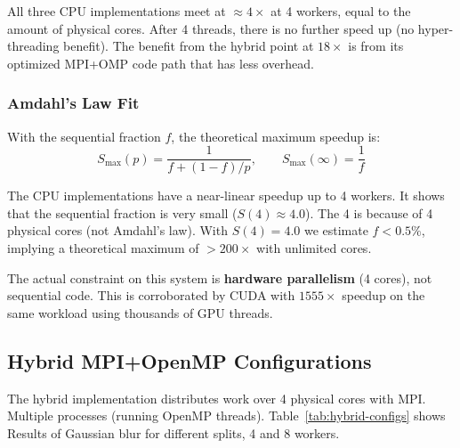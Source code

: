 ﻿\documentclass[12pt,a4paper]{article}
\begin{document}
All three CPU implementations meet at $\approx\!4\times$ at 4 workers,
equal to the amount of physical cores. After 4 threads, there is no further speed up
(no hyper-threading benefit). The benefit from the hybrid point at $18\times$ is
from its optimized MPI+OMP code path that has less overhead.

\subsubsection*{Amdahl's Law Fit}

With the sequential fraction $f$, the theoretical maximum speedup is:
\begin{equation}
  S_{\max}(p) = \frac{1}{f + (1-f)/p},\qquad
  S_{\max}(\infty) = \frac{1}{f}
\end{equation}

The CPU implementations have a near-linear speedup up to 4 workers.
It shows that the sequential fraction is very small ($S(4) \approx 4.0$).
The 4 is because of 4 physical cores (not Amdahl's
law). With $S(4) = 4.0$ we estimate $f < 0.5\%$, implying a theoretical
maximum of $>200\times$ with unlimited cores.

The actual constraint on this system is \textbf{hardware parallelism} (4 cores),
not sequential code. This is corroborated by CUDA with $1555\times$ speedup
on the same workload using thousands of GPU threads.

\subsection{Hybrid MPI+OpenMP Configurations}

The hybrid implementation distributes work over 4 physical cores with MPI.
Multiple processes (running OpenMP threads). Table~\ref{tab:hybrid-configs} shows
Results of Gaussian blur for different splits, 4 and 8 workers.
\end{document}
